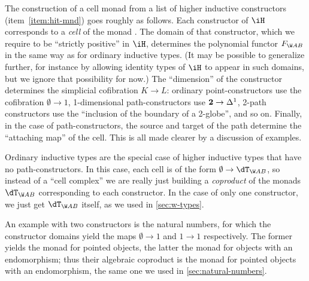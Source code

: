 \begin{enumerate}
\begin{enumerate}
The construction of a cell monad from a list of higher inductive constructors (item~\ref{item:hit-mnd}) goes roughly as follows.
Each constructor of $\iH$ corresponds to a \emph{cell} of the monad \dT.
The domain of that constructor, which we require to be ``strictly positive'' in $\iH$, determines the polynomial functor $F_{\W A B}$ in the same way as for ordinary inductive types.
(It may be possible to generalize further, for instance by allowing identity types of $\iH$ to appear in such domains, but we ignore that possibility for now.)
The ``dimension'' of the constructor determines the simplicial cofibration $K\to L$: ordinary point-constructors use the cofibration $\emptyset\to 1$, 1-dimensional path-constructors use $\mathbf{2}\to{\Delta^1}$, 2-path constructors use the ``inclusion of the boundary of a 2-globe'', and so on.
Finally, in the case of path-constructors, the source and target of the path determine the ``attaching map'' of the cell.
This is all made clearer by a discussion of examples.

\begin{eg} \label{eg:ordinary-inductives}
  Ordinary inductive types are the special case of higher inductive types that have no path-constructors.
  In this case, each cell is of the form $\emptyset \to \dT_{\W A B}$, so instead of a ``cell complex'' we are really just building a \emph{coproduct} of the monads $\dT_{\W A B}$ corresponding to each constructor.
  In the case of only one constructor, we just get $\dT_{\W A B}$ itself, as we used in \cref{sec:w-types}.

  An example with two constructors is the natural numbers, for which the constructor domains yield the maps $\emptyset\to 1$ and $1\to 1$ respectively.
  The former yields the monad for pointed objects, the latter the monad for objects with an endomorphism; thus their algebraic coproduct is the monad for pointed objects with an endomorphism, the same one we used in \cref{sec:natural-numbers}.
\end{eg}


\end{enumerate}
\end{enumerate}

